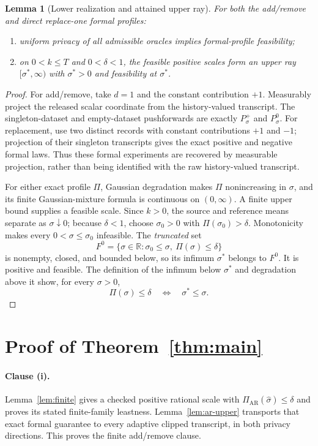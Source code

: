 \documentclass[11pt]{article}
\newtheorem{lemma}[theorem]{Lemma}
\theoremstyle{remark}
\newcommand{\R}{\mathbb{R}}
\begin{document}
\begin{lemma}[Lower realization and attained upper ray]\label{lem:threshold}
For both the add/remove and direct replace-one formal profiles:
\begin{enumerate}[label=\textup{(\alph*)},leftmargin=2.2em]
\item uniform privacy of all admissible oracles implies formal-profile
  feasibility;
\item on $0<k\leq T$ and $0<\delta<1$, the feasible positive scales form an
  upper ray $[\sigma^*,\infty)$ with $\sigma^*>0$ and feasibility at
  $\sigma^*$.
\end{enumerate}
\end{lemma}

\begin{proof}
For add/remove, take $d=1$ and the constant contribution $+1$.  Measurably
project the released scalar coordinate from the history-valued transcript.
The singleton-dataset and empty-dataset pushforwards are exactly
$P_\sigma^+$ and $P_\sigma^0$.  For replacement, use two distinct records
with constant contributions $+1$ and $-1$; projection of their singleton
transcripts gives the exact positive and negative formal laws.  Thus these
formal experiments are recovered by measurable projection, rather than being
identified with the raw history-valued transcript.

For either exact profile $\Pi$, Gaussian degradation makes $\Pi$ nonincreasing
in $\sigma$, and its finite Gaussian-mixture formula is continuous on
$(0,\infty)$.  A finite upper bound supplies a feasible scale.  Since $k>0$,
the source and reference means separate as $\sigma\downarrow0$; because
$\delta<1$, choose $\sigma_0>0$ with
$\Pi(\sigma_0)>\delta$.  Monotonicity makes every
$0<\sigma\leq\sigma_0$ infeasible.  The \emph{truncated} set
\[
 F^0=\{\sigma\in\R:\sigma_0\leq\sigma,\ \Pi(\sigma)\leq\delta\}
\]
is nonempty, closed, and bounded below, so its infimum $\sigma^*$ belongs to
$F^0$.  It is positive and feasible.  The definition of the infimum below
$\sigma^*$ and degradation above it show, for every $\sigma>0$,
\[
 \Pi(\sigma)\leq\delta\quad\Longleftrightarrow\quad\sigma^*\leq\sigma.
\]
\end{proof}

\section{Proof of Theorem~\ref{thm:main}}

\paragraph{Clause (i).}
Lemma~\ref{lem:finite} gives a checked positive rational scale with
$\Pi_{\mathrm{AR}}(\widehat\sigma)\leq\delta$ and proves its stated
finite-family leastness.  Lemma~\ref{lem:ar-upper} transports that exact
formal guarantee to every adaptive clipped transcript, in both privacy
directions.  This proves the finite add/remove clause.
\end{document}
